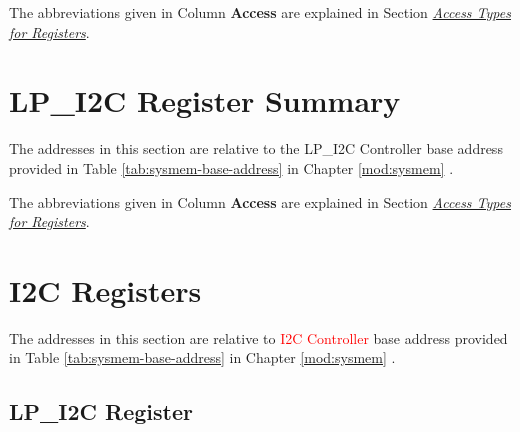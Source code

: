 \documentclass[main\_\_EN.tex]{subfiles}
\begin{document}
The abbreviations given in Column \textbf{Access} are explained in Section \hyperref[glossary-access-types]{\textit{Access Types for Registers}}.



\section{LP\_I2C Register Summary}
\label{sec:lp-i2c-reg-summ}
\hypertarget{lp-i2c-reg-summ}{}

The addresses in this section are relative to the LP\_I2C Controller base address provided in Table \ref{tab:sysmem-base-address} in Chapter \ref{mod:sysmem} \textit{}.

The abbreviations given in Column \textbf{Access} are explained in Section \hyperref[glossary-access-types]{\textit{Access Types for Registers}}.






\clearpage
\section{I2C Registers}

The addresses in this section are relative to \textcolor{red}{I2C Controller} base address provided in Table \ref{tab:sysmem-base-address} in Chapter \ref{mod:sysmem} \textit{}.




\subsection{LP\_I2C Register}

\end{document}
